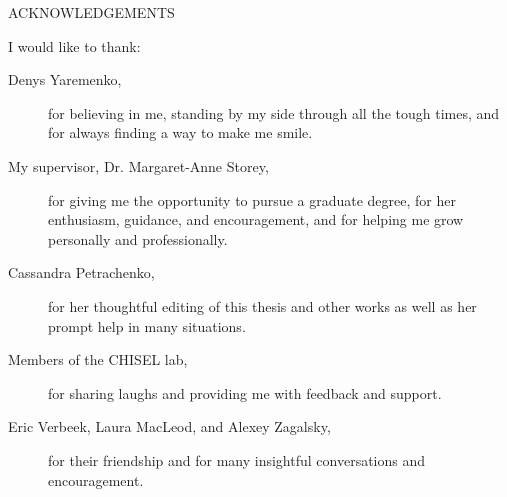 \newpage
{}

\begin{center}
ACKNOWLEDGEMENTS
\end{center}

\noindent I would like to thank:
\begin{description}
\item[Denys Yaremenko,]
	for believing in me, standing by my side through all the tough times, and for always finding a way to make me smile.
\item[My supervisor, Dr. Margaret-Anne Storey,]
	for giving me the opportunity to pursue a graduate degree, for her enthusiasm, guidance, and encouragement, and for helping me grow personally and professionally.
\item[Cassandra Petrachenko,]
	for her thoughtful editing of this thesis and other works as well as her prompt help in many situations.
\item[Members of the CHISEL lab,]
	for sharing laughs and providing me with feedback and support. 
\item[Eric Verbeek, Laura MacLeod, and Alexey Zagalsky,] 
	for their friendship and for many insightful conversations and encouragement.
	
\end{description}


